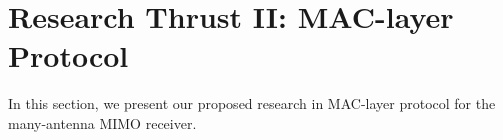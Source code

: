 \section{Research Thrust II: MAC-layer Protocol}\label{sec:mac}

In this section, we present our proposed research in MAC-layer protocol for the many-antenna MIMO receiver. 